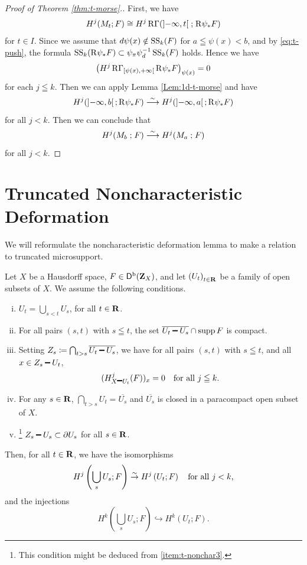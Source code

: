 \begin{proof}[Proof of Theorem {\ref{thm:t-morse}}.]
  First, we have\[
    H^{j}(M_{t};F)
    \cong
    H^{j}\RG(
      {\left]-\infty,t\right[}\mathrel{;}\Rder{\psi}_{\ast}F
    )
  \]
  for \(t\in I\).
  Since we assume that \(d\psi(x)\notin \muS[k](F)\) 
  for \(a\leqq \psi(x)<b\), and by \eqref{eq:t-push}, the formula \(
    \muS[k](\Rder{\psi}_{\ast}F)
    \subset \mpb[\psi]\mdiff[\psi]^{-1}\muS[k](F)
  \) holds. Hence we have\[
    \left(H^{j}\RG_{\left[\psi(x),+\infty\right[}\Rder{\psi}_{\ast}F\right)_{\psi(x)}=0
  \]for each \(j\leqq k\). 
  Then we can apply Lemma \ref{Lem:1d-t-morse} and have
  \[
    H^{j}(\left]-\infty,b\right[;\Rder{\psi_{\ast}}F)
    \simarr
    H^{j}(\left]-\infty,a\right[;\Rder{\psi_{\ast}}F)
  \] for all \(j<k\).
  Then we can conclude that
  \[
    H^{j}(M_b\mathrel{;}F)
    \simarr
    H^{j}(M_a\mathrel{;}F)
  \]
  for all \(j<k\).
  \end{proof}

\section{Truncated Noncharacteristic Deformation}

We will reformulate the noncharacteristic deformation 
lemma \cite[Proposition 2.7.2]{KS90} to make a relation 
to truncated microsupport. 

\begin{Proposition+}\label{prop:t-nonchar}
  Let \(X\) be a Hausdorff space, \(F\in\Dompb(\zz_X)\), and 
  let \(\left(U_{t}\right)_{t\in\rr}\) be a family of 
  open subsets of \(X\). 
  We assume the following conditions. 
  \begin{enumerate}[(i)]
    \item \label{item:t-nonchar1}
    \(U_{t}=\bigcup_{s<t}U_{s}\), for all \(t\in\rr\). 
    \item \label{item:t-nonchar2}
    For all pairs \((s,t)\) with \(s\leqq t\), 
    the set \(\overline{U_{t}\smi U_{s}}\cap \supp{F}\) is compact.
    \item \label{item:t-nonchar3}
    Setting \(
      Z_{s}\coloneqq \bigcap_{t>s}\overline{U_t\smi U_s}
    \), we have for all pairs \((s,t)\) with \(s\leqq t\), 
    and all \(x\in Z_{s}\smi U_{t}\), \[
      (H^{j}_{X\smi U_{t}}(F))_{x}=0
      \quad 
      \text{for all \(j\leqq k\).}
    \]
    \item \label{item:t-nonchar4} 
    For any \(s\in\rr\), 
    \(\bigcap_{t>s}U_{t}=\overline{U_{s}}\) 
    and 
    \(\overline{U_{s}}\) is closed 
    in a paracompact open subset of \(X\).
    \item\footnote{
      This condition might be 
      deduced from \eqref{item:t-nonchar3}.
    } \label{item:t-nonchar5} 
    \(Z_s\smi U_{s}\subset\bd{U_{s}}\) 
    for all \(s\in\rr\). 
  \end{enumerate}
  Then, for all \(t\in\rr\), we have the isomorphisms\[
    H^{j}\left(\bigcup_{s}U_{s};F\right)
    \simar 
    H^{j}\left(U_{t};F\right)
    \quad \text{for all \(j< k\),} 
  \]
  and the injections\[
    H^{k}\left(\bigcup_{s}U_{s};F\right)
    \hookrightarrow 
    H^{k}\left(U_{t};F\right).
  \] 
\end{Proposition+}

